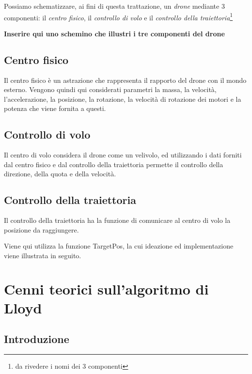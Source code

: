 \documentclass[10pt,a4paper]{article}
\newcommand{\name}[1]{{\color{purple}#1}}
\begin{document}
Possiamo schematizzare, ai fini di questa trattazione, un \textit{drone} mediante 3 componenti: il \textit{centro fisico}, il \textit{controllo di volo} e il \textit{controllo della traiettoria}\footnote{da rivedere i nomi dei 3 componenti}

\begin{center}
\textbf{Inserire qui uno schemino che illustri i tre componenti del drone}
\end{center}

\subsection{Centro fisico}

Il centro fisico è un astrazione che rappresenta il rapporto del drone con il mondo esterno. Vengono quindi qui considerati parametri la massa, la velocità, l'accelerazione, la posizione, la rotazione, la velocità di rotazione dei motori e la potenza che viene fornita a questi.

\subsection{Controllo di volo}

Il centro di volo considera il drone come un velivolo, ed utilizzando i dati forniti dal centro fisico e dal controllo della traiettoria permette il controllo della direzione, della quota e della velocità.

\subsection{Controllo della traiettoria}

Il controllo della traiettoria ha la funzione di comunicare al centro di volo la posizione da raggiungere.

Viene qui utilizza la funzione \name{TargetPos}, la cui ideazione ed implementazione viene illustrata in seguito.

\pagebreak

\section{Cenni teorici sull'algoritmo di Lloyd}

\subsection{Introduzione}
\end{document}
